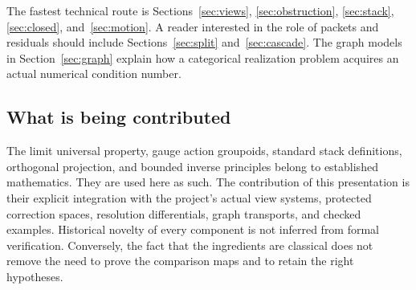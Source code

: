 \documentclass[11pt]{article}
\begin{document}
The fastest technical route is Sections~\ref{sec:views}, \ref{sec:obstruction}, \ref{sec:stack}, \ref{sec:closed}, and~\ref{sec:motion}. A reader interested in the role of packets and residuals should include Sections~\ref{sec:split} and~\ref{sec:cascade}. The graph models in Section~\ref{sec:graph} explain how a categorical realization problem acquires an actual numerical condition number.

\subsection*{What is being contributed}
The limit universal property, gauge action groupoids, standard stack definitions, orthogonal projection, and bounded inverse principles belong to established mathematics. They are used here as such. The contribution of this presentation is their explicit integration with the project's actual view systems, protected correction spaces, resolution differentials, graph transports, and checked examples. Historical novelty of every component is not inferred from formal verification. Conversely, the fact that the ingredients are classical does not remove the need to prove the comparison maps and to retain the right hypotheses.

\clearpage\begingroup\setlength{\parskip}{0pt}\tableofcontents\endgroup
\clearpage{}






\appendix


\end{document}
